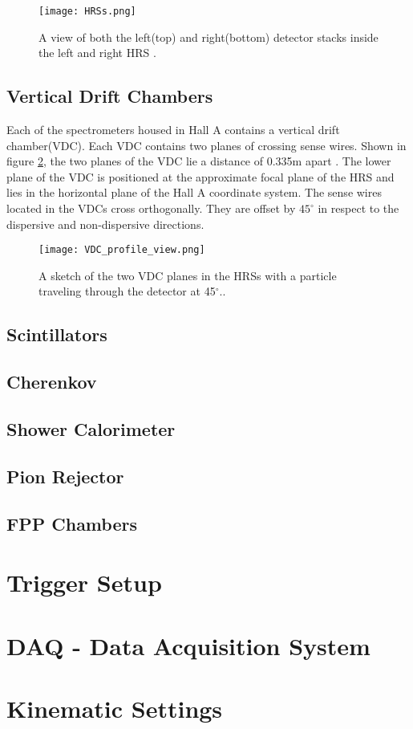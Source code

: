 \begin{figure}
\centering

\texttt{[image: HRSs.png]}

\caption{A view of both the left(top) and right(bottom) detector stacks inside the left and right HRS \cite{HallA}.
\label{hrsss}}
\end{figure}


	\subsection{Vertical Drift Chambers}
	Each of the spectrometers housed in Hall A contains a vertical drift chamber(VDC). Each VDC contains two planes of crossing sense wires. Shown in figure \ref{VDC_profile}, the two planes of the VDC lie a distance of 0.335m apart \cite{drift}. The lower plane of the VDC is positioned at the approximate focal plane of the HRS and lies in the horizontal plane of the Hall A coordinate system. The sense wires located in the VDCs cross orthogonally. They are offset by $45^\circ$ in respect to the dispersive and non-dispersive directions. 
	
	\cite{drift}
	
	
	\begin{figure}
	\centering
	
	\texttt{[image: VDC\_profile\_view.png]}
	
	\caption{A sketch of the two VDC planes in the HRSs with a particle traveling through the detector at 45$^\circ$.\cite{drift}.
	\label{VDC_profile}}
	\end{figure}
	
	
	
	
	
	\subsection{Scintillators}	\subsection{Cherenkov}
	\subsection{Shower Calorimeter}
	\subsection{Pion Rejector}
	\subsection{FPP Chambers}

\section{Trigger Setup}
\section{DAQ - Data Acquisition System}

\section{Kinematic Settings}









